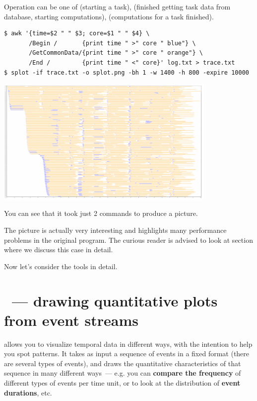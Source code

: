 \documentclass{article}
\begin{document}
Operation can be one of  (starting a task),  (finished getting task data from database, starting computations),  (computations for a task finished).

\begin{verbatim}
$ awk '{time=$2 " " $3; core=$1 " " $4} \
       /Begin /       {print time " >" core " blue"} \
       /GetCommonData/{print time " >" core " orange"} \
       /End /         {print time " <" core}' log.txt > trace.txt
$ splot -if trace.txt -o splot.png -bh 1 -w 1400 -h 800 -expire 10000
\end{verbatim}

\centerline{\includegraphics[width=0.8\textwidth]{pics/splot/splot-main-example.png}}

You can see that it took just 2 commands to produce a picture.

The picture is actually very interesting and highlights many performance problems in the original program. The curious reader is advised to look at section  where we discuss this case in detail.

Now let's consider the tools in detail.

\pagebreak
\section{\timeplot{}~--- drawing quantitative plots from event streams}
\label{sec:tplot-intro}

\timeplot{} allows you to visualize temporal data in different ways, with the intention to help you spot patterns. It takes as input a sequence of events in a fixed format (there are several types of events), and draws the quantitative characteristics of that sequence in many different ways~--- e.g. you can \textbf{compare the frequency} of different types of events per time unit, or to look at the distribution of \textbf{event durations}, etc.
\end{document}
